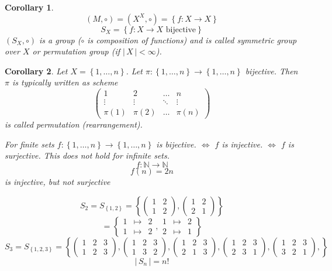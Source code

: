 \documentclass[a4paper,landscape,twocolumn]{article}
\newcommand\set[1]{\left\{#1\right\}}
\newcommand\card[1]{\left|\,#1\,\right|}
\newtheorem{cor}{Corollary}[section]
\begin{document}
\begin{cor}
  \[ (M, \circ) = (X^X, \circ) = \set{f: X \rightarrow X} \]
  \[ S_X = \set{f: X \rightarrow X \text{ bijective}} \]
  $(S_X, \circ)$ is a group ($\circ$ is composition of functions)
  and is called \emph{symmetric group} over $X$ or \emph{permutation group} (if $\card{X} < \infty$).
\end{cor}

\begin{cor}
  Let $X = \set{1, \ldots, n}$. Let $\pi: \set{1, \ldots, n} \rightarrow \set{1, \ldots, n}$ bijective.
  Then $\pi$ is typically written as scheme
  \[
    \begin{pmatrix}
       1 & 2 & \ldots & n \\
       \vdots & \vdots & \ddots & \vdots \\
       \pi(1) & \pi(2) & \ldots & \pi(n)
    \end{pmatrix}
  \]
  is called \emph{permutation} (rearrangement).

  For finite sets $f: \set{1, \ldots, n} \rightarrow \set{1, \ldots, n}$ is bijective.
  $\iff$ $f$ is injective. $\iff$ $f$ is surjective.
  This does not hold for infinite sets.
  \[ f: \mathbb{N} \rightarrow \mathbb{N} \]
  \[ f(n) = 2n \]
  is injective, but not surjective
\end{cor}

\[
  S_2
    = S_{\set{1,2}}
    = \set{\begin{pmatrix} 1 & 2 \\ 1 & 2 \end{pmatrix}, \begin{pmatrix} 1 & 2 \\ 2 & 1 \end{pmatrix}}
\] \[
  =
  \set{\begin{array}{ccc} 1 & \mapsto & 2 \\ 1 & \mapsto & 2 \end{array}, \begin{array}{ccc} 1 & \mapsto & 2 \\ 2 & \mapsto & 1 \end{array}}
\] \[
  S_3
    = S_{\set{1,2,3}}
    = \set{
      \begin{pmatrix} 1 & 2 & 3 \\ 1 & 2 & 3 \end{pmatrix},
      \begin{pmatrix} 1 & 2 & 3 \\ 1 & 3 & 2 \end{pmatrix},
      \begin{pmatrix} 1 & 2 & 3 \\ 2 & 1 & 3 \end{pmatrix},
      \begin{pmatrix} 1 & 2 & 3 \\ 2 & 3 & 1 \end{pmatrix},
      \begin{pmatrix} 1 & 2 & 3 \\ 3 & 2 & 1 \end{pmatrix},
    }
\] \[
  \card{S_n} = n!
\]
\end{document}
